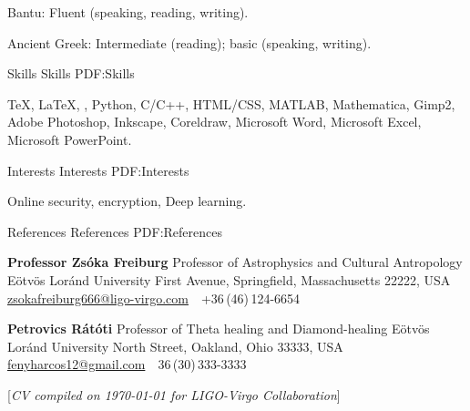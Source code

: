 \documentclass[letterpaper,yyyyMMM,nonstopmode]{simpleresumecv}
\newcommand{\CVNote}{CV compiled on {\today} for LIGO-Virgo Collaboration}
\begin{document}
\begin{Body}
\Gap
\BulletItem
Bantu: Fluent (speaking, reading, writing).

\Gap
\BulletItem
Ancient Greek: Intermediate (reading); basic (speaking, writing).

\newpage


\Section
{Skills}
{Skills}
{PDF:Skills}

\Entry
{\TeX}, {\LaTeX}, {\XeLaTeX},
Python,
C/C++,
HTML/CSS,
MATLAB,
Mathematica,
Gimp2,
Adobe Photoshop,
Inkscape,
Coreldraw,
Microsoft Word,
Microsoft Excel,
Microsoft PowerPoint.



\Section
{Interests}
{Interests}
{PDF:Interests}

\Entry
Online security,
encryption,
Deep learning.


\Section
{References}
{References}
{PDF:References}

\BulletItem
\textbf{Professor Zsóka Freiburg}
\newline
Professor of Astrophysics and Cultural Antropology
\newline
Eötvös Loránd University
 First Avenue, Springfield, Massachusetts 22222, USA
\newline
\href{mailto:zsokafreiburg666@ligo-virgo.com}
{zsokafreiburg666@ligo-virgo.com}
\,\SubBulletSymbol\,
+36\,(46)\,124-6654

\BigGap
\BulletItem
\textbf{Petrovics Rátóti}
\newline
Professor of Theta healing and Diamond-healing
\newline
Eötvös Loránd University
 North Street, Oakland, Ohio 33333, USA
\newline
\href{mailto:fenyharcos12@gmail.com}
{fenyharcos12@gmail.com}
\,\SubBulletSymbol\,
36\,(30)\,333-3333

\newpage

\end{Body}


\UseNoteFont%
\null\hfill%
[\textit{\CVNote}]
\end{document}
